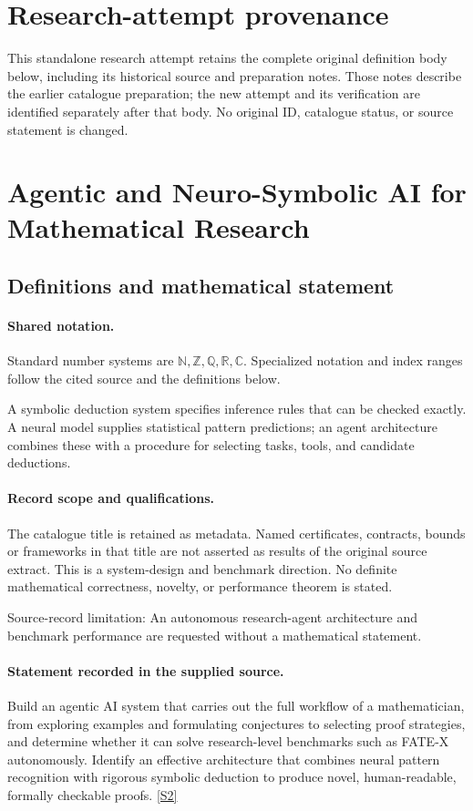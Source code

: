 \documentclass[11pt]{article}
\begin{document}
\section*{Research-attempt provenance}
This standalone research attempt retains the complete original definition body below,
including its historical source and preparation notes. Those notes describe the
earlier catalogue preparation; the new attempt and its verification are identified
separately after that body. No original ID, catalogue status, or source statement is changed.

\section{Agentic and Neuro-Symbolic AI for Mathematical Research}\label{statement}

\subsection{Definitions and mathematical statement}

\paragraph{Shared notation.}Standard number systems are $\mathbb N,\mathbb Z,\mathbb Q,\mathbb R,\mathbb C$. Specialized notation and index ranges follow the cited source and the definitions below.


A symbolic deduction system specifies inference rules that can be checked exactly. A neural model supplies statistical pattern predictions; an agent architecture combines these with a procedure for selecting tasks, tools, and candidate deductions.
\paragraph{Record scope and qualifications.}
The catalogue title is retained as metadata. Named certificates, contracts, bounds or frameworks in that title are not asserted as results of the original source extract.
This is a system-design and benchmark direction. No definite mathematical correctness, novelty, or performance theorem is stated.

Source-record limitation: An autonomous research-agent architecture and benchmark performance are requested without a mathematical statement.
\paragraph{Statement recorded in the supplied source.}
Build an agentic AI system that carries out the full workflow of a mathematician, from exploring examples and formulating conjectures to selecting proof strategies, and determine whether it can solve research-level benchmarks such as FATE-X autonomously. Identify an effective architecture that combines neural pattern recognition with rigorous symbolic deduction to produce novel, human-readable, formally checkable proofs. \href{https://doi.org/10.4171/owr/2025/43}{[S2]}
\end{document}
